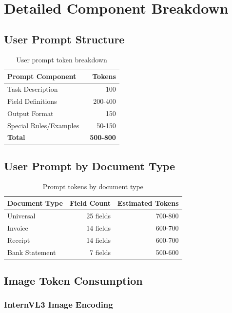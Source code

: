\documentclass[11pt,a4paper]{article}
\begin{document}
\section{Detailed Component Breakdown}

\subsection{User Prompt Structure}

\begin{table}[h]
\centering
\begin{tabular}{lr}
\toprule
\textbf{Prompt Component} & \textbf{Tokens} \\
\midrule
Task Description & ~100 \\
Field Definitions & ~200-400 \\
Output Format & ~150 \\
Special Rules/Examples & ~50-150 \\
\midrule
\textbf{Total} & \textbf{~500-800} \\
\bottomrule
\end{tabular}
\caption{User prompt token breakdown}
\end{table}

\subsection{User Prompt by Document Type}

\begin{table}[h]
\centering
\begin{tabular}{lrr}
\toprule
\textbf{Document Type} & \textbf{Field Count} & \textbf{Estimated Tokens} \\
\midrule
Universal & 25 fields & ~700-800 \\
Invoice & 14 fields & ~600-700 \\
Receipt & 14 fields & ~600-700 \\
Bank Statement & 7 fields & ~500-600 \\
\bottomrule
\end{tabular}
\caption{Prompt tokens by document type}
\end{table}

\subsection{Image Token Consumption}

\subsubsection{InternVL3 Image Encoding}
\end{document}
